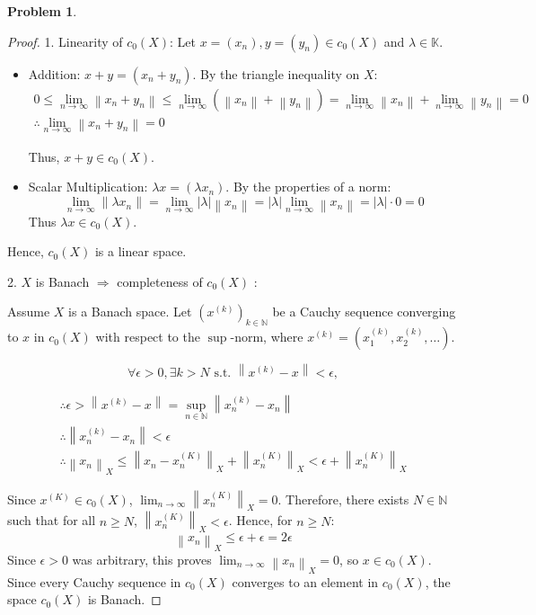 \documentclass{article}
\newcommand{\norm}[1]{\left\|#1\right\|}
\newcommand{\abs}[1]{\left|#1\right|}
\newcommand{\N}{\mathbb{N}}
\newtheorem{problem}{Problem}
\begin{document}

\begin{problem}

\end{problem}

\begin{proof}
1. Linearity of $c_0(X)$:
Let $x = (x_n), y = (y_n) \in c_0(X)$ and $\lambda \in \mathbb{K}$.
\begin{itemize}
    \item Addition: $x+y = (x_n + y_n)$. By the triangle inequality on $X$:
    \begin{gather}
        0 
        \leq \lim_{n\to\infty}\norm{x_n + y_n} 
        \leq \lim_{n\to\infty}(\norm{x_n} + \norm{y_n})
        = \lim_{n\to\infty}\norm{x_n} + \lim_{n\to\infty}\norm{y_n} = 0
        \\
        \therefore \lim_{n\to\infty} \norm{x_n + y_n} = 0
    \end{gather}
    
    Thus, $x+y \in c_0(X)$.

    \item Scalar Multiplication: $\lambda x = (\lambda x_n)$. By the properties of a norm:
    $$
    \lim_{n\to\infty} \norm{\lambda x_n} = \lim_{n\to\infty} \abs{\lambda} \norm{x_n} = \abs{\lambda} \lim_{n\to\infty} \norm{x_n} = \abs{\lambda} \cdot 0 = 0
    $$
    Thus $\lambda x \in c_0(X)$.
\end{itemize}
Hence, $c_0(X)$ is a linear space.

2. $X$ is Banach $\Longrightarrow$ completeness of $c_0(X)$ :

Assume $X$ is a Banach space. Let $(x^{(k)})_{k\in\N}$ be a Cauchy sequence converging to $x$ in $c_0(X)$ with respect to the $\sup$-norm, where $x^{(k)} = (x_1^{(k)}, x_2^{(k)}, \ldots)$.

$$
\forall \epsilon > 0, \exists k > N \text{ s.t. } 
\norm{x^{(k)} - x} < \epsilon, 
$$

\begin{gather}
\therefore \epsilon > \norm{x^{(k)} - x}
= \sup_{n\in\N} \norm{x_n^{(k)} - x_n}
\\
\therefore \norm{x_n^{(k)} - x_n} < \epsilon
\\
\therefore \norm{x_n}_{X} \leq \norm{x_n - x_n^{(K)}}_{X} + \norm{x_n^{(K)}}_{X} < \epsilon + \norm{x_n^{(K)}}_{X}
\end{gather}

Since $x^{(K)} \in c_0(X)$, $\lim_{n\to\infty} \norm{x_n^{(K)}}_{X} = 0$. Therefore, there exists $N \in \N$ such that for all $n \geq N$, $\norm{x_n^{(K)}}_{X} < \epsilon$.
Hence, for $n \geq N$:
$$\norm{x_n}_{X} \leq \epsilon + \epsilon = 2\epsilon$$
Since $\epsilon > 0$ was arbitrary, this proves $\lim_{n\to\infty} \norm{x_n}_{X} = 0$, so $x \in c_0(X)$.
Since every Cauchy sequence in $c_0(X)$ converges to an element in $c_0(X)$, the space $c_0(X)$ is Banach.
\end{proof}
\end{document}
